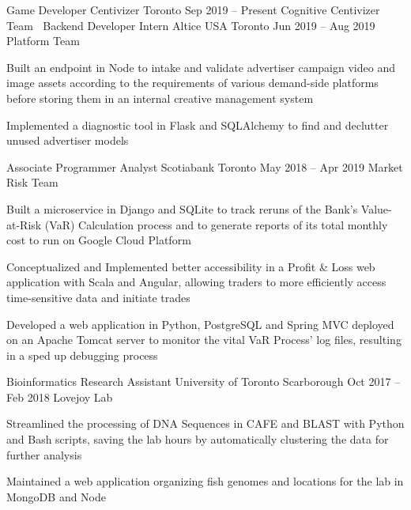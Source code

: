 \begin{cventries}
  \cventry
    {Game Developer}
    {Centivizer}
    {Toronto}
    {Sep 2019 -- Present}
    {Cognitive Centivizer Team}
    {
      $\:$
    }
  \cventry
    {Backend Developer Intern}
    {Altice USA}
    {Toronto}
    {Jun 2019 -- Aug 2019}
    {Platform Team}
    {
    \begin{cvitems}
      \item {Built an endpoint in Node to intake and validate advertiser campaign video and image assets according to the requirements of various demand-side platforms before storing them in an internal creative management system}
      \item {Implemented a diagnostic tool in Flask and SQLAlchemy to find and declutter unused advertiser models}
    \end{cvitems}
    }
  \cventry
    {Associate Programmer Analyst}
    {Scotiabank}
    {Toronto}
    {May 2018 -- Apr 2019}
    {Market Risk Team}
    {
      \begin{cvitems}
        \item {Built a microservice in Django and SQLite to track reruns of the Bank's Value-at-Risk (VaR) Calculation process and to generate reports of its total monthly cost to run on Google Cloud Platform}
        \item {Conceptualized and Implemented better accessibility in a Profit \& Loss web application with Scala and Angular, allowing traders to more efficiently access time-sensitive data and initiate trades}
        \item {Developed a web application in Python, PostgreSQL and Spring MVC deployed on an Apache Tomcat server to monitor the vital VaR Process' log files, resulting in a sped up debugging process}
      \end{cvitems}
    }

  \cventry
    {Bioinformatics Research Assistant}
    {University of Toronto}
    {Scarborough}
    {Oct 2017 -- Feb 2018}
    {Lovejoy Lab}
    {
      \begin{cvitems}
        \item {Streamlined the processing of DNA Sequences in CAFE and BLAST with Python and Bash scripts, saving the lab hours by automatically clustering the data for further analysis}
        \item {Maintained a web application organizing fish genomes and locations for the lab in MongoDB and Node}
      \end{cvitems}
    }
\end{cventries}
